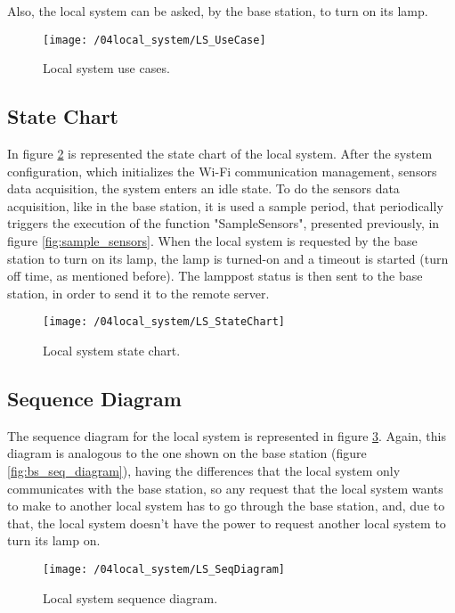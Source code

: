 Also, the local system can be asked, by the base station, to turn on its lamp.
\clearpage

\begin{figure}[ht]
	\centering
	\texttt{[image: /04local\_system/LS\_UseCase]}
	\caption{Local system use cases.}
	\label{fig:ls_use_cases}
\end{figure}

\subsection{State Chart}
In figure \ref{fig:ls_state_chart} is represented the state chart of the local system. After the system configuration, which initializes the Wi-Fi communication management, sensors data acquisition, the system enters an idle state. To do the sensors data acquisition, like in the base station, it is used a sample period, that periodically triggers the execution of the function "SampleSensors", presented previously, in figure \ref{fig:sample_sensors}. When the local system is requested by the base station to turn on its lamp, the lamp is turned-on and a timeout is started (turn off time, as mentioned before). The lamppost status is then sent to the base station, in order to send it to the remote server.

\begin{figure}[ht]
	\centering
	\texttt{[image: /04local\_system/LS\_StateChart]}
	\caption{Local system state chart.}
	\label{fig:ls_state_chart}
\end{figure}

\clearpage
\subsection{Sequence Diagram}
The sequence diagram for the local system is represented in figure \ref{fig:ls_seq_diagram}. Again, this diagram is analogous to the one shown on the base station (figure \ref{fig:bs_seq_diagram}), having the differences that the local system only communicates with the base station, so any request that the local system wants to make to another local system has to go through the base station, and, due to that, the local system doesn't have the power to request another local system to turn its lamp on.

\begin{figure}[ht]
	\centering
	\texttt{[image: /04local\_system/LS\_SeqDiagram]}
	\caption{Local system sequence diagram.}
	\label{fig:ls_seq_diagram}
\end{figure}